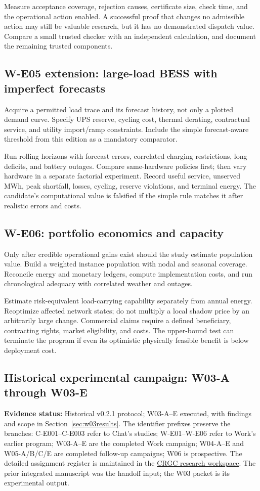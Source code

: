 \documentclass[11pt,letterpaper]{article}
\newcommand{\status}[1]{\textbf{Evidence status:} #1}
\begin{document}
Measure acceptance coverage, rejection causes, certificate size, check time, and the operational action enabled. A successful proof that changes no admissible action may still be valuable research, but it has no demonstrated dispatch value. Compare a small trusted checker with an independent calculation, and document the remaining trusted components.

\subsection{W-E05 extension: large-load BESS with imperfect forecasts}
Acquire a permitted load trace and its forecast history, not only a plotted demand curve. Specify UPS reserve, cycling cost, thermal derating, contractual service, and utility import/ramp constraints. Include the simple forecast-aware threshold from this edition as a mandatory comparator.

Run rolling horizons with forecast errors, correlated charging restrictions, long deficits, and battery outages. Compare same-hardware policies first; then vary hardware in a separate factorial experiment. Record useful service, unserved MWh, peak shortfall, losses, cycling, reserve violations, and terminal energy. The candidate's computational value is falsified if the simple rule matches it after realistic errors and costs.

\subsection{W-E06: portfolio economics and capacity}
Only after credible operational gains exist should the study estimate population value. Build a weighted instance population with nodal and seasonal coverage. Reconcile energy and monetary ledgers, compute implementation costs, and run chronological adequacy with correlated weather and outages.

Estimate risk-equivalent load-carrying capability separately from annual energy. Reoptimize affected network states; do not multiply a local shadow price by an arbitrarily large change. Commercial claims require a defined beneficiary, contracting rights, market eligibility, and costs. The upper-bound test can terminate the program if even its optimistic physically feasible benefit is below deployment cost.

\subsection{Historical experimental campaign: W03-A through W03-E}
\label{sec:w03}
\status{Historical v0.2.1 protocol; W03-A--E executed, with findings and scope in Section~\ref{sec:w03results}.} The identifier prefixes preserve the branches: C-E001--C-E003 refer to Chat's studies; W-E01--W-E06 refer to Work's earlier program; W03-A--E are the completed Work campaign; W04-A--E and W05-A/B/C/E are completed follow-up campaigns; W06 is prospective. The detailed assignment register is maintained in the \href{https://chatgpt.com/space/page_dfa9a6f1ac5081919df0487eb77df505}{CRGC research workspace}. The prior integrated manuscript was the handoff input; the W03 packet is its experimental output.
\end{document}
